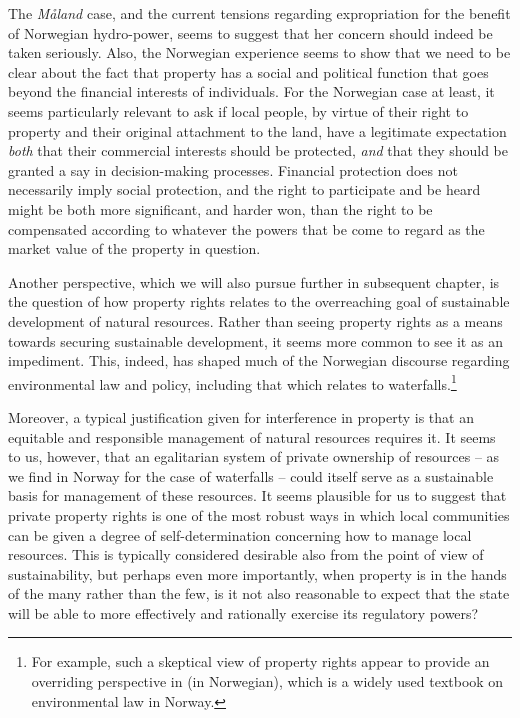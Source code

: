 The \emph{Måland} case, and the current tensions regarding expropriation for the benefit of Norwegian hydro-power, seems to suggest that her concern should indeed be taken seriously. Also, the Norwegian experience seems to show that we need to be clear about the fact that property has a social and political function that goes beyond the financial interests of individuals. For the Norwegian case at least, it seems particularly relevant to ask if local people, by virtue of their right to property and their original attachment to the land, have a legitimate expectation \emph{both} that their commercial interests should be protected, \emph{and} that they should be granted a say in decision-making processes. Financial protection does not necessarily imply social protection, and the right to participate and be heard might be both more significant, and harder won, than the right to be compensated according to whatever the powers that be come to regard as the market value of the property in question.

Another perspective, which we will also pursue further in subsequent chapter, is the question of how property rights relates to the overreaching goal of sustainable development of natural resources. Rather than seeing property rights as a means towards securing sustainable development, it seems more common to see it as an impediment. This, indeed, has shaped much of the Norwegian discourse regarding environmental law and policy, including that which relates to waterfalls.\footnote{For example, such a skeptical view of property rights appear to provide an overriding perspective in \cite{backer1} (in Norwegian), which is a widely used textbook on environmental law in Norway.} 

Moreover, a typical justification given for interference in property is that an equitable and responsible management of natural resources requires it. It seems to us, however, that an egalitarian system of private ownership of resources -- as we find in Norway for the case of waterfalls -- could itself serve as a sustainable basis for management of these resources. It seems plausible for us to suggest that private property rights is one of the most robust ways in which local communities can be given a degree of self-determination concerning how to manage local resources. This is typically considered desirable also from the point of view of sustainability, but perhaps even more importantly, when property is in the hands of the many rather than the few, is it not also reasonable to expect that the state will be able to more effectively and rationally exercise its regulatory powers? 

